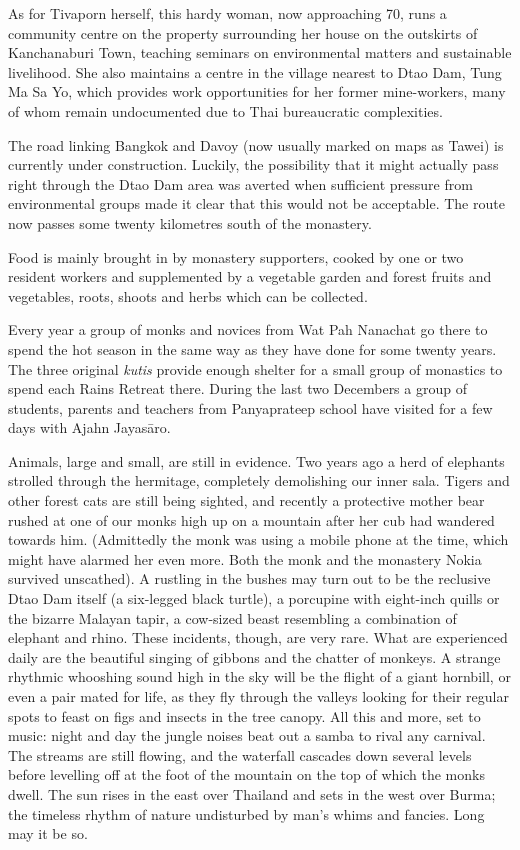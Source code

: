 As for Tivaporn herself, this hardy woman, now approaching 70, runs a
community centre on the property surrounding her house on the outskirts
of Kanchanaburi Town, teaching seminars on environmental matters and
sustainable livelihood. She also maintains a centre in the village
nearest to Dtao Dam, Tung Ma Sa Yo, which provides work opportunities
for her former mine-workers, many of whom remain undocumented due to
Thai bureaucratic complexities. 

The road linking Bangkok and Davoy (now usually marked on maps as Tawei) 
is currently under construction. Luckily, the possibility that it might
actually pass right through the Dtao Dam area was averted when
sufficient pressure from environmental groups made it clear that this
would not be acceptable. The route now passes some twenty kilometres
south of the monastery. 

Food is mainly brought in by monastery supporters, cooked by one or two
resident workers and supplemented by a vegetable garden and forest
fruits and vegetables, roots, shoots and herbs which can be collected. 

Every year a group of monks and novices from Wat Pah Nanachat go there
to spend the hot season in the same way as they have done for some
twenty years. The three original \emph{kutis} provide enough shelter for
a small group of monastics to spend each Rains Retreat there. During the
last two Decembers a group of students, parents and teachers from
Panyaprateep school have visited for a few days with Ajahn Jayasāro. 

Animals, large and small, are still in evidence. Two years ago a herd of
elephants strolled through the hermitage, completely demolishing our
inner sala. Tigers and other forest cats are still being sighted, and
recently a protective mother bear rushed at one of our monks high up on
a mountain after her cub had wandered towards him. (Admittedly the monk
was using a mobile phone at the time, which might have alarmed her even
more. Both the monk and the monastery Nokia survived unscathed). A
rustling in the bushes may turn out to be the reclusive Dtao Dam itself
 (a six-legged black turtle), a porcupine with eight-inch quills or the
bizarre Malayan tapir, a cow-sized beast resembling a combination of
elephant and rhino. These incidents, though, are very rare. What are
experienced daily are the beautiful singing of gibbons and the chatter
of monkeys. A strange rhythmic whooshing sound high in the sky will be
the flight of a giant hornbill, or even a pair mated for life, as they
fly through the valleys looking for their regular spots to feast on figs
and insects in the tree canopy. All this and more, set to music: night
and day the jungle noises beat out a samba to rival any carnival. The
streams are still flowing, and the waterfall cascades down several
levels before levelling off at the foot of the mountain on the top of
which the monks dwell. The sun rises in the east over Thailand and sets
in the west over Burma; the timeless rhythm of nature undisturbed by
man's whims and fancies. Long may it be so. 


